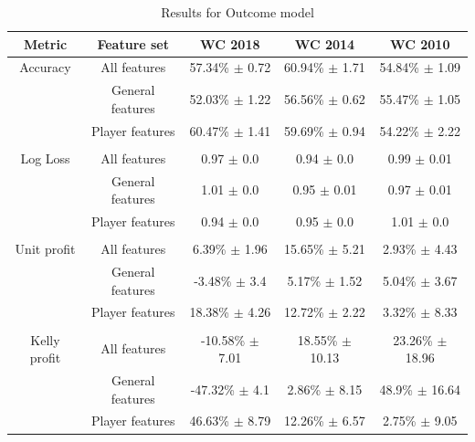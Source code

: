 \begin{table}
    \caption{Results for Outcome model}
    \begin{tabular}{| c  c| c| c| c|}
        \hline
        Metric& Feature set & \textbf{WC 2018} & \textbf{WC 2014} & \textbf{WC 2010}\\
        \hline
        Accuracy & All features & 57.34\% $\pm$ 0.72 & 60.94\% $\pm$ 1.71 & 54.84\% $\pm$ 1.09 \\
 & General features & 52.03\% $\pm$ 1.22 & 56.56\% $\pm$ 0.62 & 55.47\% $\pm$ 1.05 \\
 & Player features & 60.47\% $\pm$ 1.41 & 59.69\% $\pm$ 0.94 & 54.22\% $\pm$ 2.22 \\
 &  & & &  \\
Log Loss & All features & 0.97 $\pm$ 0.0 & 0.94 $\pm$ 0.0 & 0.99 $\pm$ 0.01 \\
 & General features & 1.01 $\pm$ 0.0 & 0.95 $\pm$ 0.01 & 0.97 $\pm$ 0.01 \\
 & Player features & 0.94 $\pm$ 0.0 & 0.95 $\pm$ 0.0 & 1.01 $\pm$ 0.0 \\
 &  & & &  \\
Unit profit & All features & 6.39\% $\pm$ 1.96 & 15.65\% $\pm$ 5.21 & 2.93\% $\pm$ 4.43 \\
 & General features & -3.48\% $\pm$ 3.4 & 5.17\% $\pm$ 1.52 & 5.04\% $\pm$ 3.67 \\
 & Player features & 18.38\% $\pm$ 4.26 & 12.72\% $\pm$ 2.22 & 3.32\% $\pm$ 8.33 \\
 &  & & &  \\
Kelly profit & All features & -10.58\% $\pm$ 7.01 & 18.55\% $\pm$ 10.13 & 23.26\% $\pm$ 18.96 \\
 & General features & -47.32\% $\pm$ 4.1 & 2.86\% $\pm$ 8.15 & 48.9\% $\pm$ 16.64 \\
 & Player features & 46.63\% $\pm$ 8.79 & 12.26\% $\pm$ 6.57 & 2.75\% $\pm$ 9.05 \\
 \hline
    \end{tabular}
    \label{table:outcomemodel}
\end{table}


